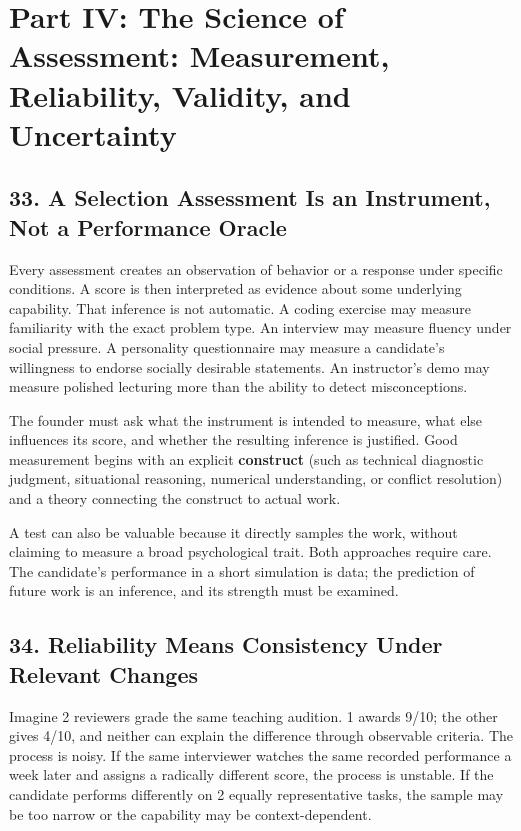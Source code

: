 \section*{Part IV: The Science of Assessment: Measurement, Reliability, Validity, and Uncertainty}

\subsection*{33. A Selection Assessment Is an Instrument, Not a Performance Oracle}

Every assessment creates an observation of behavior or a response under specific conditions. A score is then interpreted as evidence about some underlying capability. That inference is not automatic. A coding exercise may measure familiarity with the exact problem type. An interview may measure fluency under social pressure. A personality questionnaire may measure a candidate's willingness to endorse socially desirable statements. An instructor's demo may measure polished lecturing more than the ability to detect misconceptions.

The founder must ask what the instrument is intended to measure, what else influences its score, and whether the resulting inference is justified. Good measurement begins with an explicit \textbf{construct} (such as technical diagnostic judgment, situational reasoning, numerical understanding, or conflict resolution) and a theory connecting the construct to actual work.

A test can also be valuable because it directly samples the work, without claiming to measure a broad psychological trait. Both approaches require care. The candidate's performance in a short simulation is data; the prediction of future work is an inference, and its strength must be examined.

\subsection*{34. Reliability Means Consistency Under Relevant Changes}

Imagine 2 reviewers grade the same teaching audition. 1 awards 9/10; the other gives 4/10, and neither can explain the difference through observable criteria. The process is noisy. If the same interviewer watches the same recorded performance a week later and assigns a radically different score, the process is unstable. If the candidate performs differently on 2 equally representative tasks, the sample may be too narrow or the capability may be context-dependent.

